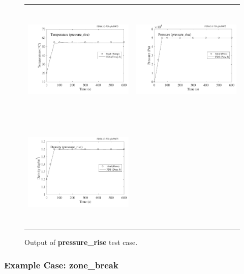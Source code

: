 \documentclass[11pt]{book}
\begin{document}
\begin{figure}[ht]
\begin{tabular*}{\textwidth}{lr}
\includegraphics[height=2.2in]{SCRIPT_FIGURES/pressure_rise_T} &
\includegraphics[height=2.2in]{SCRIPT_FIGURES/pressure_rise_P} \\
\includegraphics[height=2.2in]{SCRIPT_FIGURES/pressure_rise_R} &
\end{tabular*}
\caption[Output of {\bf pressure\_rise} test case.]{Output of {\bf pressure\_rise} test case.}
\label{pressure_rise}
\end{figure}


\subsubsection{Example Case: {\bf zone\_break}}

\label{zone_break_example}
\end{document}
